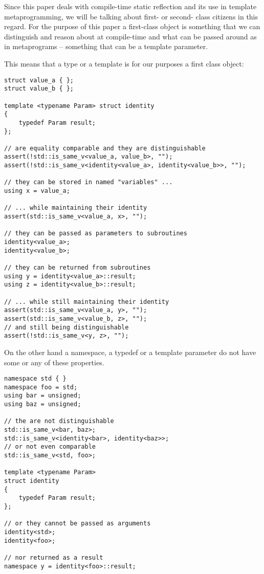 Since this paper deals with compile-time static reflection and its use
in template metaprogramming, we will be talking about first- or second- class
citizens in this regard. 
For the purpose of this paper a first-class object is something that
we can distinguish and reason about at compile-time and what can be passed around
as  in metaprograms -- something that can be a template parameter.

This means that a type or a template is for our purposes a first class object:

\begin{verbatim}
struct value_a { };
struct value_b { };

template <typename Param> struct identity
{
	typedef Param result;
};

// are equality comparable and they are distinguishable
assert(!std::is_same_v<value_a, value_b>, "");
assert(!std::is_same_v<identity<value_a>, identity<value_b>>, "");

// they can be stored in named "variables" ...
using x = value_a;

// ... while maintaining their identity
assert(std::is_same_v<value_a, x>, "");

// they can be passed as parameters to subroutines
identity<value_a>;
identity<value_b>;

// they can be returned from subroutines
using y = identity<value_a>::result;
using z = identity<value_b>::result;

// ... while still maintaining their identity
assert(std::is_same_v<value_a, y>, "");
assert(std::is_same_v<value_b, z>, "");
// and still being distinguishable
assert(!std::is_same_v<y, z>, "");
\end{verbatim}


On the other hand a namespace, a typedef or a template parameter do not have
some or any of these properties.

\begin{verbatim}
namespace std { }
namespace foo = std;
using bar = unsigned;
using baz = unsigned;

// the are not distinguishable
std::is_same_v<bar, baz>;
std::is_same_v<identity<bar>, identity<baz>>;
// or not even comparable
std::is_same_v<std, foo>;

template <typename Param>
struct identity
{
	typedef Param result;
};

// or they cannot be passed as arguments
identity<std>;
identity<foo>;

// nor returned as a result
namespace y = identity<foo>::result;
\end{verbatim}

